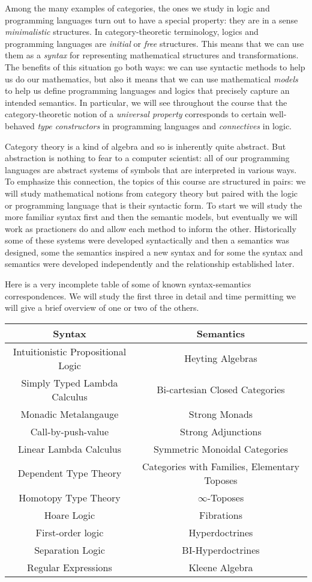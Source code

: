 \documentclass[12pt]{article}
\begin{document}
Among the many examples of categories, the ones we study in logic and
programming languages turn out to have a special property: they are in
a sense \emph{minimalistic} structures. In category-theoretic
terminology, logics and programming languages are \emph{initial} or
\emph{free} structures. This means that we can use them as a
\emph{syntax} for representing mathematical structures and
transformations. The benefits of this situation go both ways: we can
use syntactic methods to help us do our mathematics, but also it means
that we can use mathematical \emph{models} to help us define
programming languages and logics that precisely capture an intended
semantics. In particular, we will see throughout the course that the
category-theoretic notion of a \emph{universal property} corresponds
to certain well-behaved \emph{type constructors} in programming
languages and \emph{connectives} in logic.

Category theory is a kind of algebra and so is inherently quite
abstract. But abstraction is nothing to fear to a computer scientist:
all of our programming languages are abstract systems of symbols that
are interpreted in various ways. To emphasize this connection, the
topics of this course are structured in pairs: we will study
mathematical notions from category theory but paired with the logic or
programming language that is their syntactic form. To start we will
study the more familiar syntax first and then the semantic models, but
eventually we will work as practioners do and allow each method to
inform the other. Historically some of these systems were developed
syntactically and then a semantics was designed, some the semantics
inspired a new syntax and for some the syntax and semantics were
developed independently and the relationship established later.

Here is a very incomplete table of some of known syntax-semantics
correspondences. We will study the first three in detail and time
permitting we will give a brief overview of one or two of the others.
\begin{center}
\begin{tabular}{ |c|c| }
 \hline
 Syntax & Semantics\\
 \hline
 \hline
 Intuitionistic Propositional Logic & Heyting Algebras\\
 Simply Typed Lambda Calculus & Bi-cartesian Closed Categories\\
 Monadic Metalangauge & Strong Monads\\
 Call-by-push-value & Strong Adjunctions\\
 Linear Lambda Calculus & Symmetric Monoidal Categories\\
 Dependent Type Theory & Categories with Families, Elementary Toposes\\
 Homotopy Type Theory & $\infty$-Toposes\\
 Hoare Logic & Fibrations\\
 First-order logic & Hyperdoctrines\\
 Separation Logic & BI-Hyperdoctrines\\
 Regular Expressions & Kleene Algebra\\
 \hline
\end{tabular}
\end{center}
\end{document}
